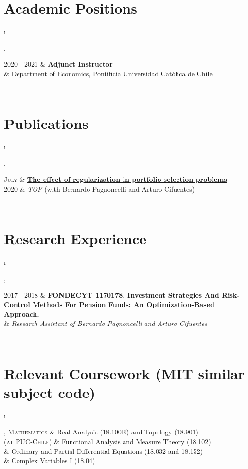 \documentclass[a4paper, 10pt]{article}
\newcommand{\tablength}{}
\newcommand{\setTabParams}[1]{\renewcommand\tablength{}\forcsvlist{\listadd\tablength}{#1}}
\newcommand{\setCols}[1]{			%
	\ifnum0=\i						%
		\ifdim0cm=#1				%
			\def \firstCol {r}		%
		\else						%
			\def \firstCol {p{#1}}		%
		\fi						%
	\else \ifnum1=\i				%
		\ifdim0cm=#1				%
			\def \secondCol {l}		%
		\else						%
			\def \secondCol{p{#1}}	%
		\fi						%
	\else \ifnum2=\i				%
		\ifnum0=#1				%
			\def \sep {}			%
		\else						%
			\def \sep {|}			%
		\fi						%
	\fi \fi \fi						%
	\advance\i by1					%
}
\newcommand{\tab}[1]{					%
	\newcount\i						%
	\forlistloop{\setCols}{\tablength}		%
	\begin{tabular}{\firstCol \sep \secondCol}	%
		#1							%
	\end{tabular} \\						%
}
\begin{document}
\section{Academic Positions}
\setTabParams{0cm,11cm,1}

\tab{
\textsc{2020 - 2021}
 	&	\textbf{Adjunct Instructor}	\\[0.2ex]
	&	Department of Economics, Pontificia Universidad Católica de Chile
}

\section{Publications}
\setTabParams{0cm,11cm,1}

\tab{
\textsc{July}	&	\href{http://links.springernature.com/f/a/UOaM73CHGS-A0wxcwW1Zhw~~/AABE5gA~/RgRg_rc5P0QwaHR0cDovL3d3dy5zcHJpbmdlci5jb20vLS8yL0FYT0xTb2g2NTh5YXNfWm11RW9KVwNzcGNCCgBIuYMdXwAuny5SG2Jlcm5hcmRvLnBhZ25vbmNlbGxpQHVhaS5jbFgEAAAG5w~~}{\textbf{The effect of regularization in portfolio selection problems}} \\[0.2ex]
\textsc{2020}	&	\textit{TOP} (with Bernardo Pagnoncelli and Arturo Cifuentes)
}

\section{Research Experience}
\setTabParams{17ex,12cm,1}

\tab{
\textsc{2017 - 2018}
 	&	\textbf{FONDECYT 1170178. Investment Strategies And Risk-Control Methods For Pension Funds: An Optimization-Based Approach.} \\[0.2ex]
	&	\emph{Research Assistant of Bernardo Pagnoncelli and Arturo Cifuentes}
}



\section{Relevant Coursework (MIT similar subject code)}
\setTabParams{3cm,12cm,1}

\tab{\textsc{Mathematics}
	&	Real Analysis (18.100B) and Topology (18.901)\\[0.2ex]
\textsc{(at PUC-Chile)}
	&	Functional Analysis and Measure Theory (18.102)\\[0.2ex]
	&	Ordinary and Partial Differential Equations (18.032 and 18.152)\\[0.2ex]
	&	Complex Variables I (18.04)\\[0.2ex]
}
\end{document}
